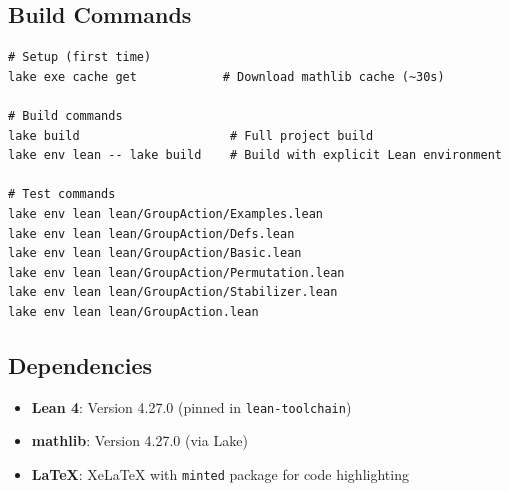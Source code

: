 \documentclass[
  12pt, %
]{assignment}
\begin{document}
\subsection{Build Commands}
\begin{verbatim}
# Setup (first time)
lake exe cache get            # Download mathlib cache (~30s)

# Build commands
lake build                     # Full project build
lake env lean -- lake build    # Build with explicit Lean environment

# Test commands
lake env lean lean/GroupAction/Examples.lean
lake env lean lean/GroupAction/Defs.lean
lake env lean lean/GroupAction/Basic.lean
lake env lean lean/GroupAction/Permutation.lean
lake env lean lean/GroupAction/Stabilizer.lean
lake env lean lean/GroupAction.lean
\end{verbatim}


\subsection{Dependencies}
\begin{itemize}
	\item \textbf{Lean 4}: Version 4.27.0 (pinned in \texttt{lean-toolchain})
	\item \textbf{mathlib}: Version 4.27.0 (via Lake)
	\item \textbf{LaTeX}: XeLaTeX with \texttt{minted} package for code highlighting
\end{itemize}
\end{document}
